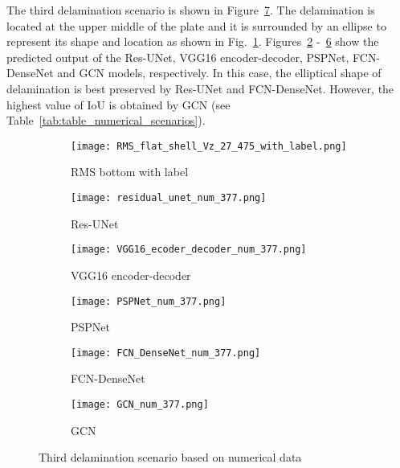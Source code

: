 \clearpage
The third delamination scenario is shown in Figure~\ref{fig:475_softmax}. 
The delamination is located at the upper middle of the plate and it is surrounded by an ellipse to represent its shape and location as shown in Fig.~\ref{fig:RMS_flat_shell_Vz_475}.
Figures~\ref{fig:Unet_Pred__softmax_475} -~\ref{fig:gcn_pred_475} show the predicted output of the Res-UNet, VGG16 encoder-decoder, PSPNet, FCN-DenseNet and GCN models, respectively. 
In this case, the elliptical shape of delamination is best preserved by Res-UNet and FCN-DenseNet. 
However, the highest value of IoU is obtained by GCN (see Table~\ref{tab:table_numerical_scenarios}).
\begin{figure}[!h]
	\centering
	\begin{subfigure}[b]{0.47\textwidth}
		\centering
		\texttt{[image: RMS\_flat\_shell\_Vz\_27\_475\_with\_label.png]}
		\caption{RMS bottom with label}
		\label{fig:RMS_flat_shell_Vz_475}
	\end{subfigure}
	\hfill
	\begin{subfigure}[b]{0.47\textwidth}
		\centering
		\texttt{[image: residual\_unet\_num\_377.png]}
		\caption{Res-UNet}
		\label{fig:Unet_Pred__softmax_475}
	\end{subfigure}
	\hfill
	\begin{subfigure}[b]{0.47\textwidth}
		\centering
		\texttt{[image: VGG16\_ecoder\_decoder\_num\_377.png]}
		\caption{VGG16 encoder-decoder}			\label{fig:vgg16_pred__softmax_475}			
	\end{subfigure}
	\hfill
	\begin{subfigure}[b]{0.47\textwidth}
		\centering
		\texttt{[image: PSPNet\_num\_377.png]}
		\caption{PSPNet}
		\label{fig:pspnet_pred__softmax_475}
	\end{subfigure}	
	\hfill
	\begin{subfigure}[b]{0.47\textwidth}
		\centering
		\texttt{[image: FCN\_DenseNet\_num\_377.png]}
		\caption{FCN-DenseNet}
		\label{fig:fcn_densenet_pred__softmax_475}
	\end{subfigure}
	\hfill
	\begin{subfigure}[b]{0.47\textwidth}
		\centering
		\texttt{[image: GCN\_num\_377.png]}
		\caption{GCN}
		\label{fig:gcn_pred_475}
	\end{subfigure}	
	\caption{Third delamination scenario based on numerical data}
	\label{fig:475_softmax}
\end{figure}
